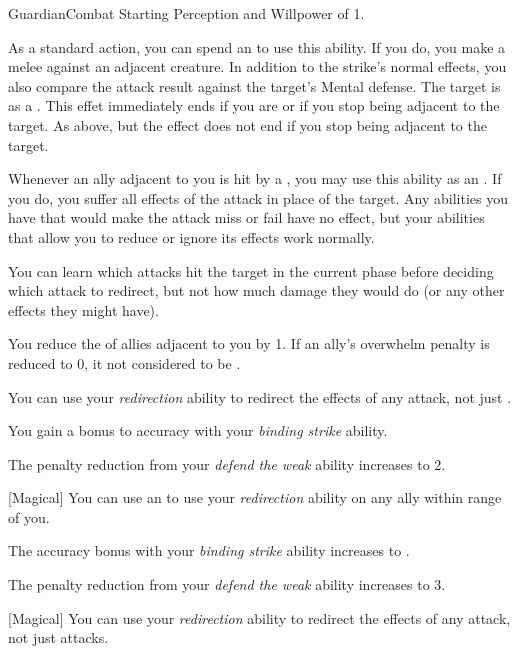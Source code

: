     \begin{feat}{Guardian}{Combat}
        \featpre Starting Perception and Willpower of 1.
        \featben

         As a standard action, you can spend an  to use this ability.
        If you do, you make a melee  against an adjacent creature.
        In addition to the strike's normal effects, you also compare the attack result against the target's Mental defense.
         The target is  as a .
        This effet immediately ends if you are  or if you stop being adjacent to the target.
         As above, but the effect does not end if you stop being adjacent to the target.

         Whenever an ally adjacent to you is hit by a , you may use this ability as an .
        If you do, you suffer all effects of the attack in place of the target.
        Any abilities you have that would make the attack miss or fail have no effect, but your abilities that allow you to reduce or ignore its effects work normally.

        You can learn which attacks hit the target in the current phase before deciding which attack to redirect, but not how much damage they would do (or any other effects they might have).

         You reduce the  of allies adjacent to you by 1.
        If an ally's overwhelm penalty is reduced to 0, it not considered to be .

         You can use your \textit{redirection} ability to redirect the effects of any  attack, not just .

         You gain a  bonus to accuracy with your \textit{binding strike} ability.

         The penalty reduction from your \textit{defend the weak} ability increases to 2.

        [Magical] You can use an  to use your \textit{redirection} ability on any ally within \rnglong range of you.

         The accuracy bonus with your \textit{binding strike} ability increases to .

         The penalty reduction from your \textit{defend the weak} ability increases to 3.

        [Magical] You can use your \textit{redirection} ability to redirect the effects of any attack, not just  attacks. 
    \end{feat}

